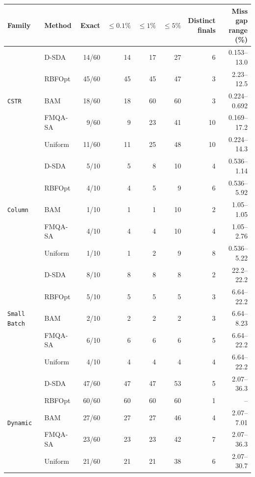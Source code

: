 \begin{tabular}{llrrrrrr}\toprule
Family & Method & Exact & \(\leq0.1\%\) & \(\leq1\%\) & \(\leq5\%\) & \makecell{Distinct\\finals} & \makecell{Miss gap\\range (\%)}\\\midrule
\multirow{5}{*}{\texttt{CSTR}} & D-SDA & 14/60 & 14 & 17 & 27 & 6 & 0.153--13.0 \\
 & RBFOpt & 45/60 & 45 & 45 & 47 & 3 & 2.23--12.5 \\
 & BAM & 18/60 & 18 & 60 & 60 & 3 & 0.224--0.692 \\
 & FMQA-SA & 9/60 & 9 & 23 & 41 & 10 & 0.169--17.2 \\
 & Uniform & 11/60 & 11 & 25 & 48 & 10 & 0.224--14.3 \\
\midrule
\multirow{5}{*}{\texttt{Column}} & D-SDA & 5/10 & 5 & 8 & 10 & 4 & 0.536--1.14 \\
 & RBFOpt & 4/10 & 4 & 5 & 9 & 6 & 0.536--5.92 \\
 & BAM & 1/10 & 1 & 1 & 10 & 2 & 1.05--1.05 \\
 & FMQA-SA & 4/10 & 4 & 4 & 10 & 4 & 1.05--2.76 \\
 & Uniform & 1/10 & 1 & 2 & 9 & 8 & 0.536--5.22 \\
\midrule
\multirow{5}{*}{\texttt{Small Batch}} & D-SDA & 8/10 & 8 & 8 & 8 & 2 & 22.2--22.2 \\
 & RBFOpt & 5/10 & 5 & 5 & 5 & 3 & 6.64--22.2 \\
 & BAM & 2/10 & 2 & 2 & 2 & 3 & 6.64--8.23 \\
 & FMQA-SA & 6/10 & 6 & 6 & 6 & 5 & 6.64--22.2 \\
 & Uniform & 4/10 & 4 & 4 & 4 & 4 & 6.64--22.2 \\
\midrule
\multirow{5}{*}{\texttt{Dynamic}} & D-SDA & 47/60 & 47 & 47 & 53 & 5 & 2.07--36.3 \\
 & RBFOpt & 60/60 & 60 & 60 & 60 & 1 & -- \\
 & BAM & 27/60 & 27 & 27 & 46 & 4 & 2.07--7.01 \\
 & FMQA-SA & 23/60 & 23 & 23 & 42 & 7 & 2.07--36.3 \\
 & Uniform & 21/60 & 21 & 21 & 38 & 6 & 2.07--30.7 \\
\bottomrule
\end{tabular}
